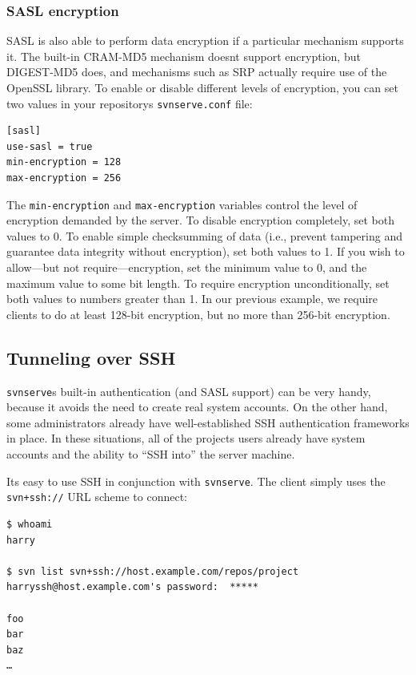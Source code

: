 \subsubsection{SASL
encryption}\label{svn.serverconfig.svnserve.sasl.encryption}

SASL is also able to perform data encryption if a particular mechanism
supports it. The built-in CRAM-MD5 mechanism doesn\textquotesingle t
support encryption, but DIGEST-MD5 does, and mechanisms such as SRP
actually require use of the OpenSSL library. To enable or disable
different levels of encryption, you can set two values in your
repository\textquotesingle s \texttt{svnserve.conf} file:

\begin{verbatim}
[sasl]
use-sasl = true
min-encryption = 128
max-encryption = 256
\end{verbatim}

The \texttt{min-encryption} and \texttt{max-encryption} variables
control the level of encryption demanded by the server. To disable
encryption completely, set both values to 0. To enable simple
checksumming of data (i.e., prevent tampering and guarantee data
integrity without encryption), set both values to 1. If you wish to
allow---but not require---encryption, set the minimum value to 0, and
the maximum value to some bit length. To require encryption
unconditionally, set both values to numbers greater than 1. In our
previous example, we require clients to do at least 128-bit encryption,
but no more than 256-bit encryption.

\subsection{Tunneling over SSH}\label{svn.serverconfig.svnserve.sshauth}

\texttt{svnserve}\textquotesingle s built-in authentication (and SASL
support) can be very handy, because it avoids the need to create real
system accounts. On the other hand, some administrators already have
well-established SSH authentication frameworks in place. In these
situations, all of the project\textquotesingle s users already have
system accounts and the ability to ``SSH into'' the server machine.

It\textquotesingle s easy to use SSH in conjunction with
\texttt{svnserve}. The client simply uses the \texttt{svn+ssh://} URL
scheme to connect:

\begin{verbatim}
$ whoami
harry

$ svn list svn+ssh://host.example.com/repos/project
harryssh@host.example.com's password:  *****

foo
bar
baz
…
\end{verbatim}

